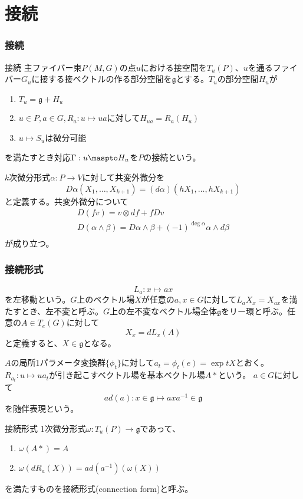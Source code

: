 \part{接続}

\section{接続}
	\begin{dfn}{接続}
		主ファイバー束$P(M, G)$の点$u$における接空間を$T_u(P)$、$u$を通るファイバー$G_u$に接する接ベクトルの作る部分空間を$\mathfrak{g}$とする。$T_u$の部分空間$H_u$が
		\begin{enumerate}
			\item $T_u = \mathfrak{g} + H_u$
			\item $u \in P, a \in G, R_a: u \mapsto ua$に対して$H_{ua} = R_a(H_u)$
			\item $u \mapsto S_u$は微分可能
		\end{enumerate}
		を満たすとき対応$\Gamma: u \maspto H_u$を$P$の接続という。
	\end{dfn}

	$k$次微分形式$\alpha: P \rightarrow V$に対して共変外微分を
		\[D\alpha(X_1, \ldots, X_{k+1}) = (d\alpha)(hX_1, \ldots, hX_{k+1})\]
	と定義する。共変外微分について
	\begin{gather*}
		D(fv) = v \otimes df + fDv\\
		D(\alpha \wedge \beta) = D\alpha \wedge \beta + (-1)^{\deg\alpha}\alpha \wedge d\beta\\
	\end{gather*}
	が成り立つ。

\section{接続形式}
		\[L_a: x \mapsto ax\]
	を左移動という。$G$上のベクトル場$X$が任意の$a, x \in G$に対して$L_aX_x = X_{ax}$を満たすとき、左不変と呼ぶ。$G$上の左不変なベクトル場全体$\mathfrak{g}$をリー環と呼ぶ。任意の$A \in T_e(G)$に対して
		\[X_x = dL_x(A)\]
	と定義すると、$X \in \mathfrak{g}$となる。

	$A$の局所1パラメータ変換群$\{\phi_t\}$に対して$a_t = \phi_t(e) = \exp tX$とおく。$R_{a_t}: u \mapsto ua_t$が引き起こすベクトル場を基本ベクトル場$A*$という。
	$a \in G$に対して
		\[ad(a): x \in \mathfrak{g} \mapsto axa^{-1} \in \mathfrak{g}\]
	を随伴表現という。
	\begin{dfn}{接続形式}
		1次微分形式$\omega: T_u(P) \rightarrow \mathfrak{g}$であって、
		\begin{enumerate}
			\item $\omega(A*) = A$
			\item $\omega(dR_a(X)) = ad(a^{-1})(\omega(X))$
		\end{enumerate}
		を満たすものを接続形式(connection form)と呼ぶ。
	\end{dfn}

